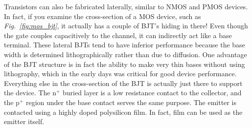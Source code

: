 Transistors can also be fabricated laterally, similar to NMOS and PMOS devices.  In fact, if you examine the cross-section of a MOS device, such as \emph{Fig.~\ref{fig:mos_bjt}}, it actually has a couple of BJT's hiding in there!  Even though the gate couples capacitively to the channel, it can indirectly act like a base terminal.  These lateral BJTs tend to have inferior performance because the base width is determined lithographically rather than due to diffusion. One advantage of the BJT structure is in fact the ability to make very thin bases without using lithography, which in the early days was critical for good device performance.
Everything else in the cross-section of the BJT is actually just there to support the device.  The n$^+$ buried layer is a low resistance contact to the collector, and the p$^+$ region under the base contact serves the same purpose.  The emitter is contacted using a highly doped polysilicon film. In fact, film can be used as the emitter itself.
